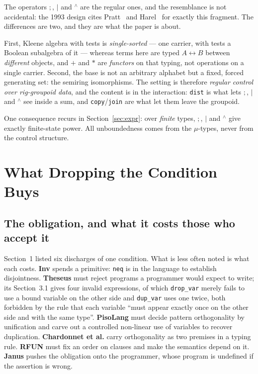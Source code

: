 \documentclass[runningheads,envcountsame]{llncs}
\newcommand{\iso}{\leftrightarrow}
\newcommand{\clo}{\ensuremath{^{\wedge}}}
\begin{document}
The operators $;$, $\mid$ and $\clo$ are the regular ones, and the resemblance
is not accidental: the 1993 design cites Pratt~\cite{pratt} and Harel~\cite{harel}
for exactly this fragment. The differences are two, and they are what the paper is
about.

First, Kleene algebra with tests is \emph{single-sorted} --- one carrier, with
tests a Boolean subalgebra of it --- whereas terms here are typed $A \iso B$
between \emph{different} objects, and $+$ and $*$ are \emph{functors} on that
typing, not operations on a single carrier. Second, the base is not an arbitrary
alphabet but a fixed, forced generating set: the semiring isomorphisms. The setting
is therefore \emph{regular control over rig-groupoid data}, and the content is in
the interaction: \texttt{dist} is what lets $;$, $\mid$ and $\clo$ see inside a
sum, and \texttt{copy}/\texttt{join} are what let them leave the groupoid.

One consequence recurs in Section~\ref{sec:expr}: over \emph{finite} types, $;$,
$\mid$ and $\clo$ give exactly finite-state power. All unboundedness comes from
the $\mu$-types, never from the control structure.

\section{What Dropping the Condition Buys}\label{sec:buys}

\subsection{The obligation, and what it costs those who accept it}

Section~1 listed six discharges of one condition. What is less often noted is what
each costs. \textbf{Inv} spends a primitive: \texttt{neq} is in the language to
establish disjointness. \textbf{Theseus} must reject programs a programmer would
expect to write; its Section~3.1 gives four invalid expressions, of which
\texttt{drop\_var} merely fails to use a bound variable on the other side and
\texttt{dup\_var} uses one twice, both forbidden by the rule that each variable
``must appear exactly once on the other side and with the same type''.
\textbf{PisoLang} must decide pattern orthogonality by unification and carve out a
controlled non-linear use of variables to recover duplication.
\textbf{Chardonnet et al.} carry orthogonality as two premises in a typing rule.
\textbf{RFUN} must fix an order on clauses and make the semantics depend on it.
\textbf{Janus} pushes the obligation onto the programmer, whose program is
undefined if the assertion is wrong.
\end{document}
